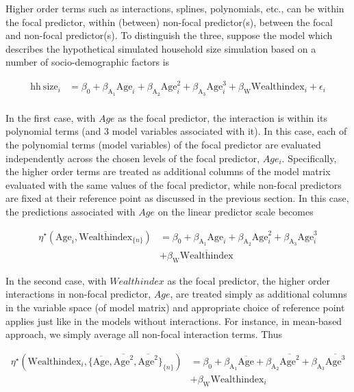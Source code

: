 \documentclass[10pt,letterpaper]{article}
\newcommand{\nset}[1]{#1_{\{n\}}}
\let\over=\overline
\begin{document}
Higher order terms such as interactions, splines, polynomials, etc., can be within the focal predictor, within (between) non-focal predictor(s), between the focal and non-focal predictor(s). To distinguish the three, suppose the model which describes the hypothetical simulated household size simulation based on a number of socio-demographic factors is

\begin{align}\label{sim:lm_cubic}
\mathrm{hh~size}_i &= \beta_0 + \beta_{\mathrm{A_1}}\mathrm{Age}_i + \beta_{\mathrm{A_2}}\mathrm{Age}^2_i + \beta_{\mathrm{A_3}}\mathrm{Age}^3_i + \beta_{\mathrm{W}}\mathrm{Wealthindex}_i + \epsilon_i \nonumber\\
\end{align}

In the first case, with $Age$ as the focal predictor, the interaction is within its polynomial terms (and 3 model variables associated with it). In this case, each of the polynomial terms (model variables) of the focal predictor are evaluated independently across the chosen levels of the focal predictor, $Age_i$. Specifically, the higher order terms are treated as additional columns of the model matrix evaluated with the same values of the focal predictor, while non-focal predictors are fixed at their reference point as discussed in the previous section. In this case, the predictions associated with $Age$ on the linear predictor scale becomes

\begin{align*}
\eta^\star(\mathrm{Age}_i, \nset{{\over{\mathrm{Wealthindex}}}}) &= \beta_0 + \beta_{\mathrm{A_1}}\mathrm{Age}_i + \beta_{\mathrm{A_2}}\mathrm{Age}^2_i + \beta_{\mathrm{A_3}}\mathrm{Age}^3_i\\
	& + \beta_{\mathrm{W}}\over{\mathrm{Wealthindex}}
\end{align*}

In the second case, with $Wealthindex$ as the focal predictor, the higher order interactions in non-focal predictor, $Age$, are treated simply as additional columns in the variable space (of model matrix) and appropriate choice of reference point applies just like in the models without interactions. For instance, in mean-based approach, we simply average all non-focal interaction terms. Thus

\begin{align*}
\eta^\star(\mathrm{Wealthindex}_i, \nset{{\{\over{\mathrm{Age}}, \over{\mathrm{Age}^2}, \over{\mathrm{Age}^2}\}}}) &= \beta_0 + \beta_{\mathrm{A_1}}\over{\mathrm{Age}} + \beta_{\mathrm{A_2}}\over{\mathrm{Age}^2} + \beta_{\mathrm{A_3}}\over{\mathrm{Age}^3}\\
	& + \beta_{\mathrm{W}}\mathrm{Wealthindex}_i
\end{align*}
\end{document}
